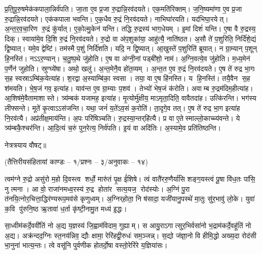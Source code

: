 प्र॒ति॒पू॒रु॒षमेक॑कपाला॒न्निर्व॑पति। जा॒ता ए॒व प्र॒जा रु॒द्रान्नि॒रव॑दयते। एक॒मति॑रिक्तम्। ज॒नि॒ष्यमा॑णा ए॒व प्र॒जा रु॒द्रान्नि॒रव॑दयते। एक॑कपाला भवन्ति। ए॒क॒धैव रु॒द्रं नि॒रव॑दयते। नाभिघा॑रयति। यद॑भिघा॒रयेत्। अ॒न्त॒र॒व॒चा॒रिण रु॒द्रं कु॑र्यात्। ए॒को॒ल्मु॒केन॑ यन्ति। 
तद्धि रु॒द्रस्य॑ भाग॒धेयम्। इ॒मां दिशं॑ यन्ति। ए॒षा वै रु॒द्रस्य॒ दिक्। स्वाया॑मे॒व दि॒शि रु॒द्रं नि॒रव॑दयते। रु॒द्रो वा अ॑प॒शुका॑या॒ आहु॑त्यै॒ नाति॑ष्ठत। अ॒सौ ते॑ प॒शुरिति॒ निर्दि॑शे॒द्यं द्वि॒ष्यात्। यमे॒व द्वेष्टि॑। तम॑स्मै प॒शुं निर्दि॑शति। यदि॒ न द्वि॒ष्यात्। आ॒खुस्ते॑ प॒शुरिति॑ ब्रूयात्। 
न ग्रा॒म्यान् प॒शून् हि॒नस्ति॑। नऽऽर॒ण्यान्। च॒तु॒ष्प॒थे जु॑होति। ए॒ष वा अ॑ग्नी॒नां पड्बी॑शो॒ नाम॑। अ॒ग्नि॒वत्ये॒व जु॑होति। म॒ध्य॒मेन॑ प॒र्णेन॑ जुहोति। स्रुग्घ्ये॑षा। अथो॒ खलु॑। अ॒न्त॒मेनै॒व हो॑त॒व्यम्। अ॒न्त॒त ए॒व रु॒द्रं नि॒रव॑दयते। 
ए॒ष ते॑ रुद्र भा॒गः स॒ह स्वस्राऽम्बि॑क॒येत्या॑ह। श॒रद्वा अ॒स्याम्बि॑का॒ स्वसा। तया॒ वा ए॒ष हि॑नस्ति। य हि॒नस्ति॑। तयै॒वैन स॒ह श॑मयति। भे॒ष॒जं गव॒ इत्या॑ह। याव॑न्त ए॒व ग्रा॒म्याः प॒शव॑। तेभ्यो॑ भेष॒जं क॑रोति। अवाम्ब रु॒द्रम॑दिम॒हीत्या॑ह। आ॒शिष॑मे॒वैतामाशास्ते। 
त्र्य॑म्बकं यजामह॒ इत्या॑ह। मृ॒त्योर्मु॑क्षीय॒ माऽमृता॒दिति॒ वावैतदा॑ह। उत्कि॑रन्ति। भग॑स्य लीफ्सन्ते। मूते॑ कृ॒त्वाऽऽस॑जन्ति। यथा॒ जनं॑ य॒ते॑ऽव॒सं क॒रोति॑। ता॒दृगे॒व तत्। ए॒ष ते॑ रुद्र भा॒ग इत्या॑ह नि॒रव॑त्यै। अप्र॑तीक्ष॒माय॑न्ति। अ॒पः परि॑षिञ्चति। \mbox{रु॒द्रस्या॒न्तर्‌\mbox{}\hspace{-0.5ex}हि॑त्यै}। प्र वा ए॒तेस्माल्लो॒काच्च्य॑वन्ते। ये त्र्य॑म्बकै॒श्चर॑न्ति। आ॒दि॒त्यं च॒रुं पुन॒रेत्य॒ निर्व॑पति। इ॒यं वा अदि॑तिः। अ॒स्यामे॒व प्रति॑तिष्ठन्ति। 

नेत्रत्रयाय वौषट्॥

{\small \closesection}



{}
\centerline{\normalsize (तैत्तिरीयसंहितायां काण्डः – १/प्रश्नः – ३/अनुवाकः – १४)}

त्वम॑ग्ने रु॒द्रो असु॑रो म॒हो दि॒वस्त्व शर्धो॒ मारु॑तं पृ॒क्ष ई॑शिषे। त्वं वातै॑ररु॒णैर्या॑सि शङ्ग॒यस्त्वं पू॒षा वि॑ध॒तः पा॑सि॒ नु त्मना।
आ वो॒ राजा॑नमध्व॒रस्य॑ रु॒द्र होता॑र सत्य॒यज॒ रोद॑स्योः। अ॒ग्निं पु॒रा त॑नयि॒त्नोर॒चित्ता॒द्धिर॑ण्यरूप॒मव॑से कृणुध्वम्। अ॒ग्निर्‌होता॒ नि ष॑सादा॒ यजी॑यानु॒पस्थे॑ मा॒तुः सु॑र॒भावु॑ लो॒के। युवा॑ क॒वि पु॑रुनि॒ष्ठ ऋ॒तावा॑ ध॒र्ता कृ॑ष्टी॒नामु॒त मध्य॑ इ॒द्धः। 

सा॒ध्वीम॑कर्दे॒ववी॑तिं नो अ॒द्य य॒ज्ञस्य॑ जि॒ह्वाम॑विदाम॒ गुह्याम्। स आयु॒राऽगात्सुर॒भिर्वसा॑नो भ॒द्राम॑कर्दे॒वहू॑तिं नो अ॒द्य। अक्र॑न्दद॒ग्निः स्त॒नय॑न्निव॒ द्यौः क्षामा॒ रेरि॑हद्वी॒रुधः॑ सम॒ञ्जन्न्। स॒द्यो ज॑ज्ञा॒नो वि हीमि॒द्धो अख्य॒दा रोद॑सी भा॒नुना॑ भात्य॒न्तः। त्वे वसू॑नि पुर्वणीक होतर्दो॒षा वस्तो॒रेरि॑रे य॒ज्ञिया॑सः। 

